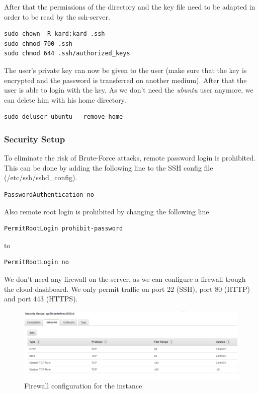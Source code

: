 After that the permissions of the directory and the key file need to be adapted in order to be read by the ssh-server.
\begin{lstlisting}
sudo chown -R kard:kard .ssh
sudo chmod 700 .ssh
sudo chmod 644 .ssh/authorized_keys
\end{lstlisting}

The user's private key can now be given to the user (make sure that the key is encrypted and the password is transferred on another medium). After that the user is able to login with the key. As we don't need the \textit{ubuntu} user anymore, we can delete him with his home directory.
\begin{lstlisting}
sudo deluser ubuntu --remove-home 
\end{lstlisting}

\subsubsection{Security Setup}
To eliminate the risk of Brute-Force attacks, remote password login is prohibited. This can be done by adding the following line to the SSH config file (/etc/ssh/sshd\_config).
\begin{lstlisting}
PasswordAuthentication no
\end{lstlisting}

Also remote root login is prohibited by changing the following line
\begin{lstlisting}
PermitRootLogin prohibit-password
\end{lstlisting}
to
\begin{lstlisting}
PermitRootLogin no
\end{lstlisting}

We don't need any firewall on the server, as we can configure a firewall trough the cloud dashboard. We only permit traffic on port 22 (SSH), port 80 (HTTP) and port 443 (HTTPS).
\begin{figure}[H]
	\centering
	\includegraphics[width=\textwidth]{img/Security-Group}
	\caption{Firewall configuration for the instance}
	\label{fig:SecGroup}
\end{figure}

